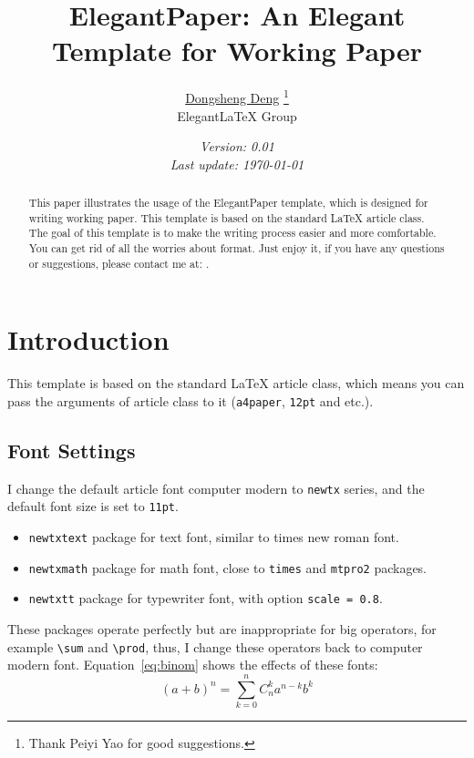 \documentclass{elegantpaper}
\title{ElegantPaper: An Elegant Template for Working Paper}
\author{\href{https://ddswhu.me/}{Dongsheng Deng} %
		\thanks{Thank Peiyi Yao for good suggestions.} \\[0.5ex] %
		Elegant\LaTeX{} Group}
\date{\small\itshape Version: 0.01 \\ Last update: \today}
\begin{document}
\maketitle

\begin{abstract}
	This paper illustrates the usage of the ElegantPaper template, which is designed for writing working paper. This template is based on the standard \LaTeX{} article class. The goal of this template is to make the writing process easier and more comfortable. You can get rid of all the worries about format. Just enjoy it, if you have any questions or suggestions, please contact me at: .
\end{abstract}

\section{Introduction}

This template is based on the standard \LaTeX{} article class, which means you can pass the arguments of article class to it (\verb|a4paper|, \verb|12pt| and etc.).

\subsection{Font Settings}
I change the default article font computer modern to \verb|newtx| series, and the default font size is set to \verb|11pt|.

\begin{itemize}[noitemsep]
	\item \verb|newtxtext| package for text font, similar to times new roman font.
	\item \verb|newtxmath| package for math font, close to \verb|times| and \verb|mtpro2| packages.
	\item \verb|newtxtt| package for typewriter font, with option \verb|scale = 0.8|.
\end{itemize}

These packages operate perfectly but are inappropriate for big operators, for example \verb|\sum| and \verb|\prod|, thus, I change these operators back to computer modern font. Equation~\eqref{eq:binom} shows the effects of these fonts:
\begin{equation}
(a+b)^{n} = \sum_{k=0}^{n} C_{n}^{k} a^{n-k} b^k \label{eq:binom}
\end{equation}
\end{document}
